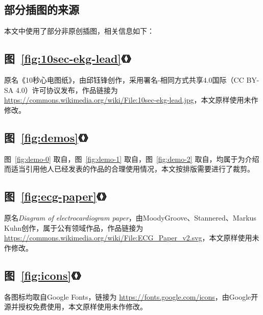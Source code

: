 

\begin{appendix}

    \begingroup
    \renewcommand{\clearpage}{\relax}
    \listoftodos
    \endgroup

    \listoffigures
    \listoffigureEng


    \chapter*{部分插图的来源}\label{ch:license}

    本文中使用了部分非原创插图，相关信息如下：

    \section*{图~\ref{fig:10sec-ekg-lead}《》}

    原名《10秒心电图纸》，由邱钰锋创作，采用署名-相同方式共享4.0国际（CC BY-SA 4.0）许可协议发布，作品链接为 \url{https://commons.wikimedia.org/wiki/File:10sec-ekg-lead.jpg}，本文原样使用未作修改。

    \section*{图~\ref{fig:demos}《》}

    图~\ref{fig:demo-0} 取自\cite{chenJiyushenduxuexidexindianfenximoxingdeshejiyuyouhua2021}，图~\ref{fig:demo-1} 取自\cite{liuJiyuyidongzhongduanfenxidekechuandairouxingxindianjiancexitong2021}，图~\ref{fig:demo-2} 取自\cite{jinPredictingCardiovascularDisease2009}，均属于为介绍而适当引用他人已经发表的作品的合理使用情况，本文按排版需要进行了裁剪。

    \section*{图~\ref{fig:ecg-paper}《》}

    原名\textit{Diagram of electrocardiogram paper}，由MoodyGroove、Stannered、Markus Kuhn创作，属于公有领域作品，作品链接为 \url{https://commons.wikimedia.org/wiki/File:ECG_Paper_v2.svg}，本文原样使用未作修改。

    \section*{图~\ref{fig:icons}《》}

    各图标均取自Google Fonts，链接为 \url{https://fonts.google.com/icons}，由Google开源并授权免费使用，本文原样使用未作修改。

\end{appendix}
